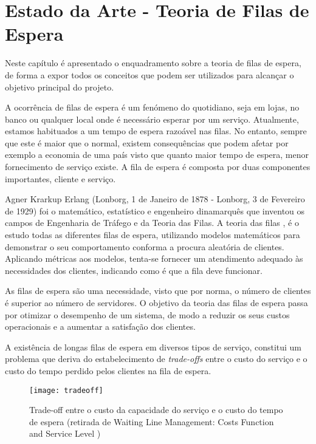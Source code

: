 \chapter{Estado da Arte - Teoria de Filas de Espera}
\label{cha:estadoDaArte}

Neste capítulo é apresentado o enquadramento sobre a teoria de filas de espera, de forma a expor todos os conceitos que podem ser utilizados para alcançar o objetivo principal do projeto. 

A ocorrência de filas de espera é um fenómeno do quotidiano, seja em lojas, no banco ou qualquer local onde é necessário esperar por um serviço. Atualmente, estamos habituados a um tempo de espera razoável nas filas. No entanto, sempre que este é maior que o normal, existem consequências que podem afetar por exemplo a economia de uma país visto que quanto maior tempo de espera, menor fornecimento de serviço existe.
A fila de espera é composta por duas componentes importantes, cliente e serviço.

Agner Krarkup Erlang (Lonborg, 1 de Janeiro de 1878 - Lonborg, 3 de Fevereiro de 1929) foi o matemático, estatístico e engenheiro dinamarquês que inventou os campos de Engenharia de Tráfego e da Teoria das Filas. A teoria das filas \cite{filasdeespera} \cite{operationsresearch}, é o estudo todas as diferentes filas de espera, utilizando modelos matemáticos para demonstrar o seu comportamento conforma a procura aleatória de clientes. Aplicando métricas aos modelos, tenta-se fornecer um atendimento adequado às necessidades dos clientes, indicando como é que a fila deve funcionar. 

As filas de espera são uma necessidade, visto que por norma, o número de clientes é superior ao número de servidores. 
O objetivo da teoria das filas de espera passa por otimizar o desempenho de um sistema, de modo a reduzir os seus custos operacionais e a aumentar a satisfação dos clientes. 

A existência de longas filas de espera em diversos tipos de serviço, constitui um problema que deriva do estabelecimento de \textit{trade-offs} entre o custo do serviço e o custo do tempo perdido pelos clientes na fila de espera.

\begin{figure}[ht]
	\centering
	\texttt{[image: tradeoff]}
	  \caption{Trade-off entre o custo da capacidade do serviço e o custo do tempo de espera (retirada de Waiting Line Management: Costs Function and Service Level \cite{wlm})}
  \label{fig:trade_off}
\end{figure}

